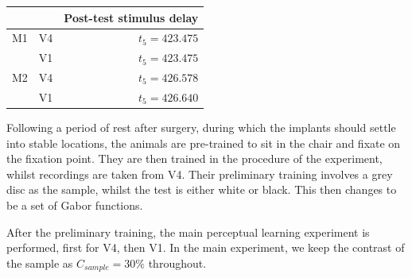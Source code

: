 \begin{table}[hbtp]
\begin{center}
\begin{tabular}{ccr}
\midrule
        &           & Post-test stimulus delay \\
\midrule
M1      & V4        & $t_5 = 423.475$ \\
        & V1        & $t_5 = 423.475$ \\
M2      & V4        & $t_5 = 426.578$ \\
        & V1        & $t_5 = 426.640$ \\
\bottomrule
%
%
\end{tabular}
\end{center}
\end{table}

Following a period of rest after surgery, during which the implants should settle into stable locations, the animals are pre-trained to sit in the chair and fixate on the fixation point.
They are then trained in the procedure of the experiment, whilst recordings are taken from \ac{V4}.
Their preliminary training involves a grey disc as the sample, whilst the test is either white or black.
This then changes to be a set of Gabor functions.


After the preliminary training, the main perceptual learning experiment is performed, first for \ac{V4}, then \ac{V1}.
In the main experiment, we keep the contrast of the sample as $C_{sample} = 30\%$ throughout.

